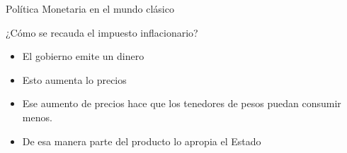 \documentclass{beamer}
\begin{document}
\begin{frame}{Política Monetaria en el mundo clásico}
 
\end{frame}





    



\begin{frame}{¿Cómo se recauda el impuesto inflacionario?}

    \begin{itemize}
        \item El gobierno emite un dinero
        \item Esto aumenta lo precios
        \item Ese aumento de precios hace que los tenedores de pesos puedan consumir menos.
        \item De esa manera parte del producto lo apropia el Estado
    \end{itemize}
    
\end{frame}

\end{document}
